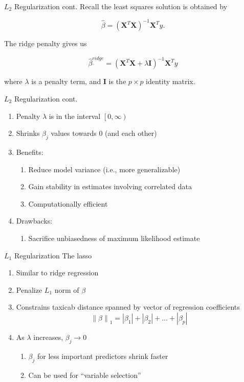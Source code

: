 \documentclass[pdf]{beamer}
\newcommand\norm[1]{\left\lVert#1\right\rVert}
\begin{document}
		
		\begin{frame}{$L_2$ Regularization cont.}
			Recall the least squares solution is obtained by
			\vspace{-1em}
			\begin{center}
				$$ \widehat{\beta} = \left(\bm{X}^T\bm{X}\right)^{-1} \bm{X}^Ty. $$
			\end{center}
			The ridge penalty gives us
			\vspace{-1em}
			\begin{center}
				$$ \widehat{\beta}^{ridge} = \left(\bm{X}^T\bm{X} + \lambda\bm{I}\right)^{-1} \bm{X}^Ty $$
			\end{center}
			\vspace{1em}
			where $\lambda$ is a penalty term, and $\bm{I}$ is the $p \times p$ identity matrix.
		\end{frame}
		
		
		\begin{frame}{$L_2$ Regularization cont.}
		\begin{enumerate}
			\item Penalty $\lambda$ is in the interval $\left[0, \infty \right)$
			\item Shrinks $\beta_j$ values towards $0$ (and each other)  
			\item Benefits: 
				\begin{enumerate}[1]
					\item Reduce model variance (i.e., more generalizable)
					\item Gain stability in estimates involving correlated data
					\item Computationally efficient
				\end{enumerate}
							
			\item Drawbacks:
				\begin{enumerate}[1] 
					\item Sacrifice unbiasedness of maximum likelihood estimate 
				\end{enumerate}
		\end{enumerate}
		\end{frame}
		
		\begin{frame}{$L_1$ Regularization}
		The lasso
		\begin{enumerate}
			\item Similar to ridge regression
			\item Penalize $L_1$ norm of $\beta$
			\item Constrains taxicab distance spanned by vector of regression coefficients
			$$ \norm{\beta}_1 = \left|\beta_{1}\right| + \left|\beta_{2}\right| + ... + \left|\beta_{p}\right| $$
			\item As $\lambda$ increases, $\beta_j \rightarrow 0$ 
				\begin{enumerate}[1]
					\item $\beta_j$ for less important predictors shrink faster
					\item Can be used for ``variable selection''
				\end{enumerate}
		\end{enumerate}
		\end{frame}
\end{document}
